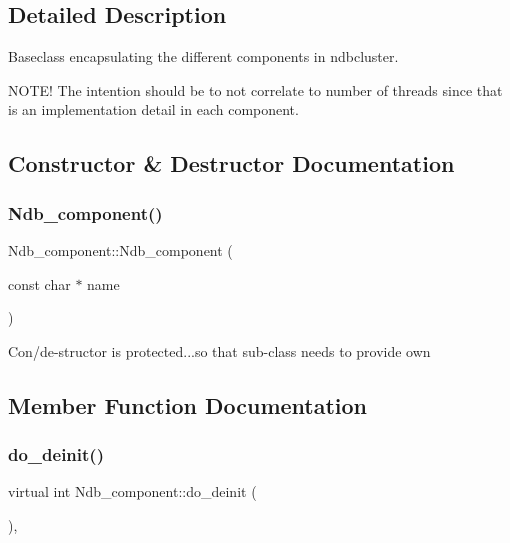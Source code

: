 \subsection{Detailed Description}
Baseclass encapsulating the different components in ndbcluster.

N\+O\+T\+E! The intention should be to not correlate to number of threads since that is an implementation detail in each component. 

\subsection{Constructor \& Destructor Documentation}
\mbox{\label{classNdb__component_ad12d0d1f27286955b4d5df258abdb696}} 
\subsubsection{\texorpdfstring{Ndb\+\_\+component()}{Ndb\_component()}}
{\footnotesize\ttfamily Ndb\+\_\+component\+::\+Ndb\+\_\+component (\begin{DoxyParamCaption}\item[{const char $\ast$}]{name }\end{DoxyParamCaption})\hspace{0.3cm}{\ttfamily [protected]}}

Con/de-\/structor is protected...so that sub-\/class needs to provide own 

\subsection{Member Function Documentation}
\mbox{\label{classNdb__component_abb9ab4eb1e2451914a7ba29a4511479c}} 
\subsubsection{\texorpdfstring{do\+\_\+deinit()}{do\_deinit()}}
{\footnotesize\ttfamily virtual int Ndb\+\_\+component\+::do\+\_\+deinit (\begin{DoxyParamCaption}{ }\end{DoxyParamCaption})\hspace{0.3cm}{\ttfamily [protected]}, {}}

